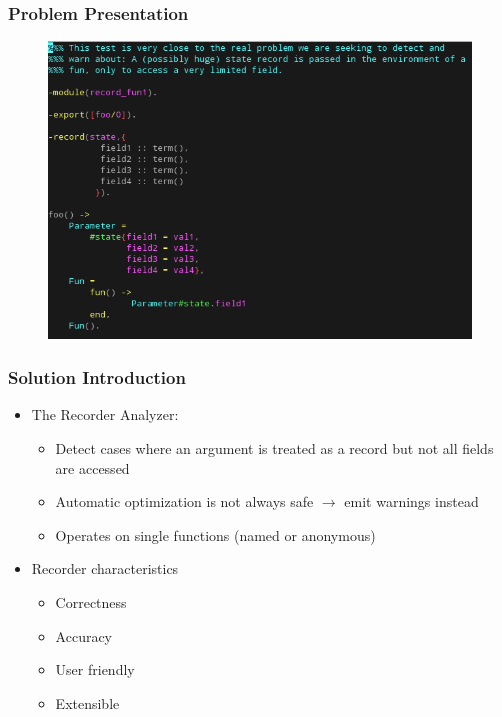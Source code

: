 \begin{frame}
  \frametitle{Problem Presentation}
  
  \begin{figure}
    \centering
    \includegraphics[scale=0.45]{../figures/problem_introduction}
  \end{figure}
  
\end{frame}

\begin{frame}
  \frametitle{Solution Introduction}
  
  \begin{itemize}
  \item The Recorder Analyzer:
    \begin{itemize}
    \item Detect cases where an argument is treated as a record but not all
      fields are accessed
    \item Automatic optimization is not always safe $\to$ emit warnings instead
    \item Operates on single functions (named or anonymous)
    \end{itemize}
  \item Recorder characteristics
    \begin{itemize}
    \item Correctness
    \item Accuracy
    \item User friendly
    \item Extensible
    \end{itemize}
  \end{itemize}
  
\end{frame}
